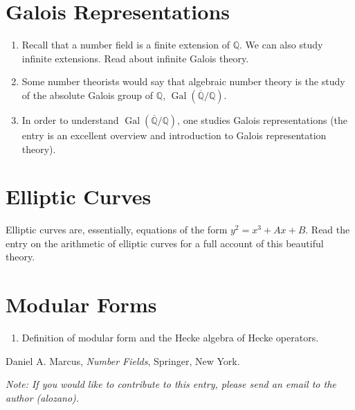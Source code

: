 \documentclass[12pt]{article}
\newcommand{\Rats}{\mathbb{Q}}
\newcommand{\Gal}{\operatorname{Gal}}
\begin{document}
\section{Galois Representations}
\begin{enumerate}
\item Recall that a number field is a finite extension of $\Rats$. We can also study infinite extensions. Read about infinite Galois theory.
\item Some number theorists would say that algebraic number theory is the study of the absolute Galois group of $\Rats$, $\Gal(\overline{\Rats}/\Rats)$.
\item In order to understand $\Gal(\overline{\Rats}/\Rats)$, one studies Galois representations (the entry is an excellent overview and introduction to Galois representation theory).
\end{enumerate}
\section{Elliptic Curves}

Elliptic curves are, essentially, equations of the form $y^2=x^3+Ax+B$. Read the entry on the arithmetic of elliptic curves for a full account of this beautiful theory. 

\section{Modular Forms}

\begin{enumerate}
\item Definition of modular form and the Hecke algebra of Hecke operators.
\end{enumerate}

\begin{thebibliography}{Mar}
 Daniel A. Marcus, {\it Number Fields}, Springer, New York. 
\end{thebibliography}

{\it Note: If you would like to contribute to this entry, please send an email to the author (alozano).}
\end{document}

